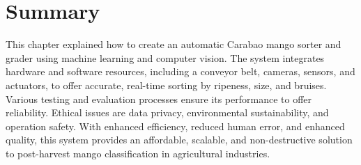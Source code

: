 

\section{Summary}
This chapter explained how to create an automatic Carabao mango sorter and grader using machine learning and computer vision. The system integrates hardware and software resources, including a conveyor belt, cameras, sensors, and actuators, to offer accurate, real-time sorting by ripeness, size, and bruises. Various testing and evaluation processes ensure its performance to offer reliability. Ethical issues are data privacy, environmental sustainability, and operation safety. With enhanced efficiency, reduced human error, and enhanced quality, this system provides an affordable, scalable, and non-destructive solution to post-harvest mango classification in agricultural industries.
